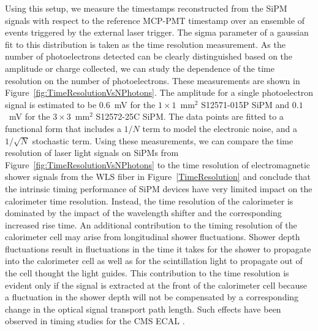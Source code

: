 Using this setup, we measure the timestamps reconstructed from the SiPM signals
with respect to the reference MCP-PMT timestamp over an ensemble of events
triggered by the external laser trigger. The sigma parameter of a gaussian fit
to this distribution is taken as the time resolution measurement.
As the number of photoelectrons detected can be clearly distinguished 
based on the amplitude or charge collected, we can study the dependence of the 
time resolution on the number of photoelectrons. These measurements are shown in 
Figure~\ref{fig:TimeResolutionVsNPhotons}. The amplitude for a single
photoelectron signal is estimated to be $0.6$~mV for the $1\times1$~$\mathrm{mm}^{2}$ 
S12571-015P SiPM and $0.1$~mV for 
the $3\times 3$~$\mathrm{mm}^{2}$ S12572-25C SiPM. 
The data points are fitted to a functional form that includes a $1/N$ term to model 
the electronic noise, and a $1/\sqrt{N}$ stochastic term. Using these 
measurements, we can compare the time resolution of laser light signals on
SiPMs from Figure~\ref{fig:TimeResolutionVsNPhotons} to the time resolution
of electromagnetic shower signals from the WLS fiber in Figure~\ref{TimeResolution}
and conclude that the intrinsic timing performance of SiPM devices 
have very limited impact on the calorimeter time resolution.
Instead, the time resolution of the calorimeter is dominated by the 
impact of the wavelength shifter and the corresponding increased rise time.
An additional contribution to the timing resolution of the calorimeter cell may
arise from longitudinal shower fluctuations. Shower depth fluctuations result in
fluctuations in the time it takes for the shower to propagate into the
calorimeter cell as well as for the scintillation light to propagate out of the
cell thought the light guides. This contribution to the time resolution
is evident only if the signal is extracted at the front of the calorimeter
cell because a fluctuation in the shower depth will not be 
compensated by a corresponding change in the optical signal 
transport path length. Such effects have been observed in
timing studies for the CMS ECAL \cite{ecalupgrade}.

